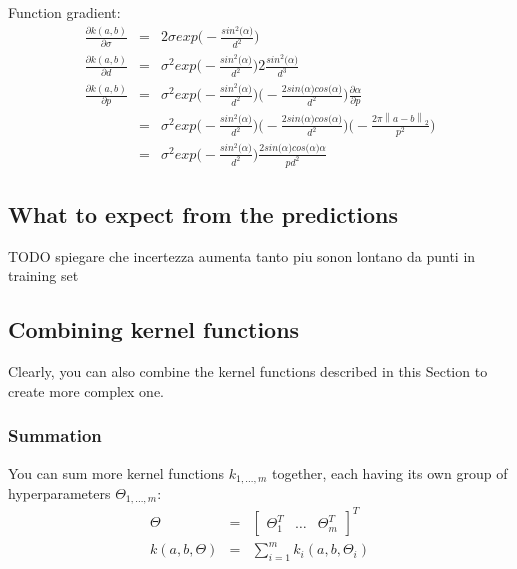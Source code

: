 \documentclass{article}
\begin{document}
Function gradient:
\begin{eqnarray}
\frac{\partial k (a,b)}{\partial \sigma} &=& 2 \sigma exp \bigg ( -\frac{sin^2 \big( \alpha \big)}{d^2}  \bigg ) \\
\frac{\partial k (a,b)}{\partial d} &=& \sigma^2 exp \bigg ( -\frac{sin^2 \big( \alpha \big)}{d^2}  \bigg ) 2 \frac{sin^2 \big( \alpha \big)}{d^3} \\
\frac{\partial k (a,b)}{\partial p} 
&=&  \sigma^2 exp \bigg ( -\frac{sin^2 \big( \alpha \big)}{d^2}  \bigg ) \bigg ( - \frac{2 sin \big( \alpha \big) cos \big( \alpha \big)}{ d^2} \bigg ) \frac{\partial \alpha}{ \partial p} \nonumber \\
&=& \sigma^2 exp \bigg ( -\frac{sin^2 \big( \alpha \big)}{d^2}  \bigg ) \bigg ( - \frac{2 sin \big( \alpha \big) cos \big( \alpha \big)}{ d^2} \bigg ) \bigg ( - \frac{2 \pi \left \| a - b \right \| _2}{p^2} \bigg ) \nonumber \\
&=& \sigma^2 exp \bigg ( -\frac{sin^2 \big( \alpha \big)}{d^2}  \bigg ) \frac{2 sin \big( \alpha \big) cos \big( \alpha \big) \alpha}{p d^2}  
\end{eqnarray}

\subsection{What to expect from the predictions}

TODO spiegare che incertezza aumenta tanto piu sonon lontano da punti in training set

\subsection{Combining kernel functions}

Clearly, you can also combine the kernel functions described in this Section to create more complex one.

\subsubsection{Summation}

You can sum more kernel functions $k_{1,\hdots,m}$ together, each having its own group of hyperparameters $\Theta_{1,\hdots,m}$:
\begin{eqnarray}
\Theta &=& \begin{bmatrix} \Theta_1^T & \hdots & \Theta_m^T \end{bmatrix}^T \\
k(a,b,\Theta) &=& \sum_{i=1}^m k_i(a,b,\Theta_i)
\end{eqnarray}
\end{document}
